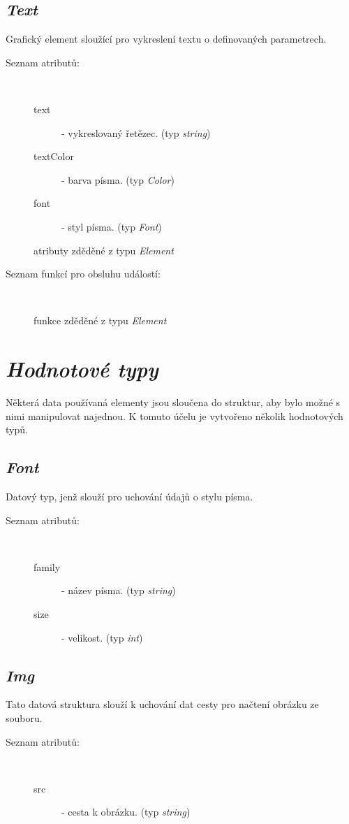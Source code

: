\documentclass[11pt,twoside,a4paper]{book}
\begin{document}
\subsection{\textit{Text}}
Grafický element sloužící pro vykreslení textu o definovaných parametrech.\\
\begin{description}
\item[Seznam atributů:] ~
\begin{description}
\item[text] - vykreslovaný řetězec. (typ \textit{string})
\item[textColor] - barva písma. (typ \textit{Color})
\item[font] - styl písma. (typ \textit{Font})
\item[atributy zděděné z typu \textit{Element}]
\end{description}
\item[Seznam funkcí pro obsluhu událostí:] ~
\begin{description}
\item[funkce zděděné z typu \textit{Element}]
\end{description}
\end{description}

\section{\textit{Hodnotové typy}}
Některá data používaná elementy jsou sloučena do struktur, aby bylo možné s nimi manipulovat najednou. K tomuto účelu je vytvořeno několik hodnotových typů.
\subsection{\textit{Font}}
Datový typ, jenž slouží pro uchování údajů o stylu písma.\\
\begin{description}
\item[Seznam atributů:] ~
\begin{description}
\item[family] - název písma. (typ \textit{string})
\item[size] - velikost. (typ \textit{int})
\end{description}
\end{description}

\subsection{\textit{Img}}
Tato datová struktura slouží k uchování dat cesty pro načtení obrázku ze souboru.\\
\begin{description}
\item[Seznam atributů:] ~
\begin{description}
\item[src] - cesta k obrázku. (typ \textit{string})
\end{description}
\end{description}
\end{document}
